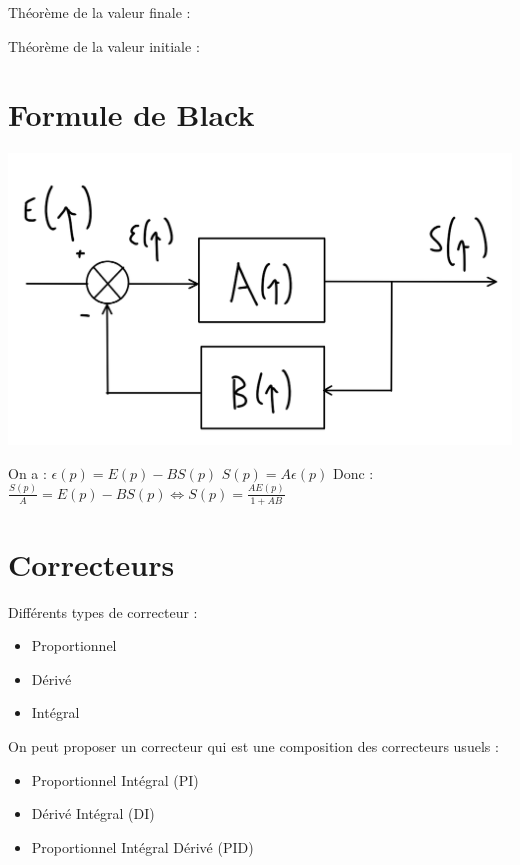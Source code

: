 Théorème de la valeur finale : \newline
\begin{center}
\end{center}
Théorème de la valeur initiale : \newline
\begin{center}
\end{center}

\newpage
\section{Formule de Black}
\begin{center}
    \includegraphics[scale=0.3]{Pics/Black.png}
\end{center}

On a :
\Large{$\epsilon (p) = E(p) - BS(p)$} \newline
\Large{$S(p) = A\epsilon (p)$} \newline
Donc :
\Large{$\frac{S(p)}{A} = E(p) - BS(p) \Longleftrightarrow S(p) = \frac{AE(p)}{1+AB}$}
\begin{center}
\LARGE{}   
\end{center}

\section{Correcteurs}
Différents types de correcteur :
\begin{itemize}
    \item Proportionnel
    \item Dérivé
    \item Intégral
\end{itemize}
On peut proposer un correcteur qui est une composition des correcteurs usuels :
\begin{itemize}
    \item Proportionnel Intégral (PI)
    \item Dérivé Intégral (DI)
    \item Proportionnel Intégral Dérivé (PID)
\end{itemize}
\newpage
